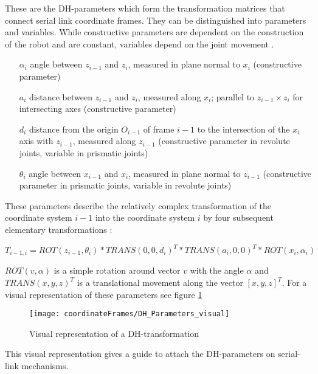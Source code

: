 These are the \ac{DH}-parameters which form the transformation matrices that connect serial link coordinate frames. They can be distinguished into parameters and variables. While constructive parameters are dependent on the construction of the robot and are constant, variables depend on the joint movement \cite{FwdInvAnalysRobManip} \cite{ConstantinForwardKA} \cite{DenavitHartenbergKonventionen}.

\begin{enumerate}[label=\emph{\arabic*)}]
	\item[$\alpha_i$] angle between $z_{i-1}$ and $z_i$, measured in plane normal to $x_i$ (constructive parameter)
	\item[$a_i$] distance between $z_{i-1}$ and $z_i$, measured along $x_i$; parallel to $z_{i-1} \times z_i$ for intersecting axes (constructive parameter)
	\item[$d_i$] distance from the origin $O_{i-1}$ of frame $i-1$ to the intersection of the $x_i$ axis with $z_{i-1}$, measured along $z_{i-1}$ (constructive parameter in revolute joints, variable in prismatic joints)
	\item[$\theta_i$] angle between $x_{i-1}$ and $x_i$, measured in plane normal to $z_{i-1}$ (constructive parameter in prismatic joints, variable in revolute joints)
\end{enumerate}

These parameters describe the relatively complex transformation of the coordinate system $i-1$ into the coordinate system $i$ by four subsequent elementary transformations \cite{allgInvKin}:

\begin{equation} \label{eq:DH-Transform}
	T_{i-1,i}=ROT(z_{i-1}, \theta_i) * TRANS(0,0,d_i)^T * TRANS(a_i,0,0)^T * ROT(x_i,\alpha_i)
\end{equation}

$ROT(v,\alpha)$ is a simple rotation around vector $v$ with the angle $\alpha$ and $TRANS(x,y,z)^T$ is a translational movement along the vector $[x,y,z]^T$. For a visual representation of these parameters see figure \ref{fig:DH_Parameters_visual} 

\begin{figure}[H]
	\texttt{[image: coordinateFrames/DH\_Parameters\_visual]}
	\caption{Visual representation of a \ac{DH}-transformation}
	\label{fig:DH_Parameters_visual}
\end{figure}

This visual representation gives a guide to attach the \ac{DH}-parameters on serial-link mechanisms.


